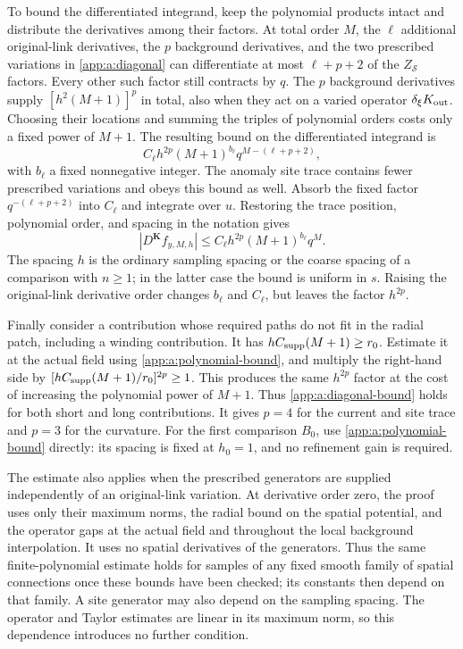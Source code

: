 \documentclass[11pt,a4paper]{article}
\theoremstyle{remark}
\begin{document}
To bound the differentiated integrand, keep the polynomial products
intact and distribute the derivatives among their factors. At total
order $M$, the $\ell$ additional original-link derivatives, the
$p$ background derivatives, and the two prescribed variations in
\eqref{app:a:diagonal} can differentiate at most $\ell+p+2$
of the $Z_{\mathcal S}$ factors. Every other such factor still
contracts by $q$. The $p$ background derivatives supply
$[h^2(M+1)]^p$ in total, also when they act on a varied operator
$\delta_\xi K_{\rm out}$. Choosing their locations and summing
the triples of polynomial orders costs only a fixed power of $M+1$.
The resulting bound on the differentiated integrand is
\begin{equation}
 C_\ell h^{2p}(M+1)^{b_\ell}q^{M-(\ell+p+2)},
\end{equation}
with $b_\ell$ a fixed nonnegative integer. The anomaly site trace
contains fewer prescribed variations and obeys this bound as well.
Absorb the fixed factor $q^{-(\ell+p+2)}$ into $C_\ell$ and
integrate over $u$. Restoring the trace position, polynomial order,
and spacing in the notation gives
\begin{equation}
 |D^{\boldsymbol K}f_{y,M,h}|
       \le C_\ell h^{2p}(M+1)^{b_\ell}q^M.
 \label{app:a:diagonal-bound}
\end{equation}
The spacing $h$ is the ordinary sampling spacing or the coarse spacing
of a comparison with $n\ge1$; in the latter case the bound is uniform
in $s$. Raising the original-link derivative order changes $b_\ell$
and $C_\ell$, but leaves the factor $h^{2p}$.

Finally consider a contribution whose required paths do not fit in the
radial patch, including a winding contribution. It has
$hC_{\rm supp}(M+1)\ge r_0$. Estimate it at the actual field
using \eqref{app:a:polynomial-bound}, and multiply the right-hand
side by $[hC_{\rm supp}(M+1)/r_0]^{2p}\ge1$. This produces
the same $h^{2p}$ factor at the cost of increasing the polynomial
power of $M+1$. Thus \eqref{app:a:diagonal-bound} holds for both
short and long contributions. It gives $p=4$ for the current and
site trace and $p=3$ for the curvature. For the first comparison
$B_0$, use \eqref{app:a:polynomial-bound} directly: its spacing is
fixed at $h_0=1$, and no refinement gain is required.

The estimate also applies when the prescribed generators are supplied
independently of an original-link variation. At derivative order zero,
the proof uses only their maximum norms, the radial bound on the spatial
potential, and the operator gaps at the actual field and throughout the
local background interpolation. It uses no spatial derivatives of the
generators. Thus the same finite-polynomial estimate holds for samples
of any fixed smooth family of spatial connections once these bounds
have been checked; its constants then depend on that family. A site
generator may also depend on the sampling spacing. The operator and
Taylor estimates are linear in its maximum norm, so this dependence
introduces no further condition.
\end{document}
